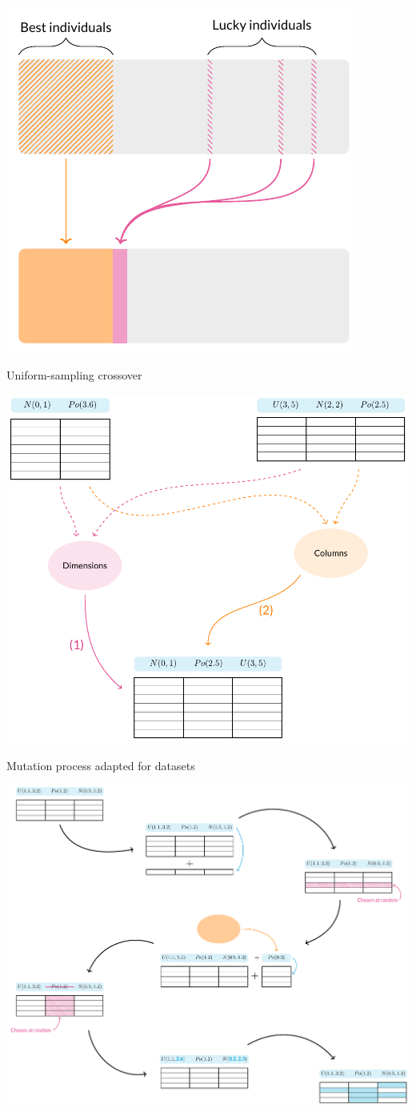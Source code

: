 \documentclass{betterposter}
\begin{document}
{\vspace{.5ex}\begin{center}
    \includegraphics[width=.65\linewidth]{tex/selection.pdf}
\end{center}

Uniform-sampling crossover

\vspace{.5ex}\begin{center}
    \includegraphics[width=.8\linewidth]{tex/crossover.pdf}
\end{center}

Mutation process adapted for datasets

\vspace{.5ex}\begin{center}
    \includegraphics[width=.9\linewidth]{tex/mutation.pdf}
\end{center}
}
\end{document}
